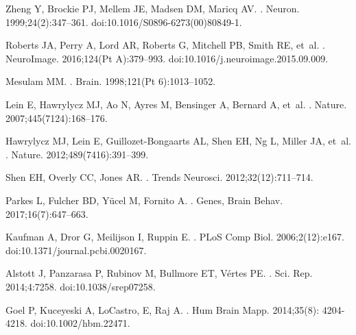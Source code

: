 \documentclass[10pt,letterpaper]{article}
\begin{document}
{\begin{thebibliography}{100}
Zheng Y, Brockie PJ, Mellem JE, Madsen DM, Maricq AV.
.
\newblock Neuron. 1999;24(2):347--361.
\newblock doi:{10.1016/S0896-6273(00)80849-1}.

Roberts JA, Perry A, Lord AR, Roberts G, Mitchell PB, Smith RE, et~al.
.
\newblock NeuroImage. 2016;124(Pt A):379--993.
\newblock doi:{10.1016/j.neuroimage.2015.09.009}.


Mesulam MM.
.
\newblock Brain. 1998;121(Pt 6):1013--1052.

Lein E, Hawrylycz MJ, Ao N, Ayres M, Bensinger A, Bernard A, et~al.
.
\newblock Nature. 2007;445(7124):168--176.

Hawrylycz MJ, Lein E, Guillozet-Bongaarts AL, Shen EH, Ng L, Miller JA, et~al.
.
\newblock Nature. 2012;489(7416):391--399.

Shen EH, Overly CC, Jones AR.
.
\newblock Trends Neurosci. 2012;32(12):711--714.

Parkes L, Fulcher BD, Y{\"u}cel M, Fornito A.
.
\newblock Genes, Brain Behav. 2017;16(7):647--663.

Kaufman A, Dror G, Meilijson I, Ruppin E.
.
\newblock PLoS Comp Biol. 2006;2(12):e167.
\newblock doi:{10.1371/journal.pcbi.0020167}.

Alstott J, Panzarasa P, Rubinov M, Bullmore ET, V{\'{e}}rtes PE.
.
\newblock Sci. Rep. 2014;4:7258.
\newblock doi:{10.1038/srep07258}.

Goel P, Kuceyeski A, LoCastro, E, Raj A.
.
\newblock Hum Brain Mapp. 2014;35(8): 4204-4218.
\newblock doi:{10.1002/hbm.22471}.


\end{thebibliography}}
\end{document}
